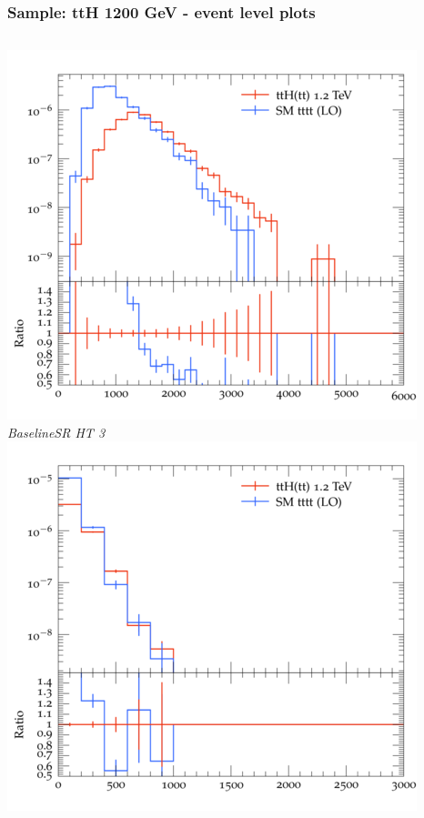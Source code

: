 \documentclass{beamer}
\begin{document}
\begin{frame}
\frametitle{Sample: ttH 1200 GeV - event level plots}
\begin{columns}
\includegraphics[width=\textwidth]{../plots/ttH_1200/tttt_ttH_1LOS/BaselineSR_HT_3.png}\\
\textit{\small BaselineSR HT 3}
\includegraphics[width=\textwidth]{../plots/ttH_1200/tttt_ttH_1LOS/BaselineSR_MET.png}\\

\end{columns}
\end{frame}
\end{document}
